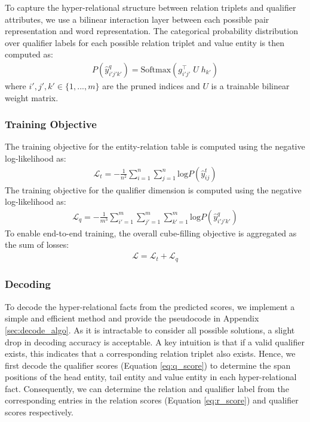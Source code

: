 \documentclass[11pt]{article}
\begin{document}
To capture the hyper-relational structure between relation triplets and qualifier attributes, we use a bilinear interaction layer between each possible pair representation and word representation.
The categorical probability distribution over qualifier labels for each possible relation triplet and value entity is then computed as:
\begin{align} \label{eq:q_score}
    P(\hat{y}^q_{i'j'k'}) = \text{Softmax}(g_{i'j'}^\intercal \; U \; h_{k'})
\end{align}
where $i',j',k' \in \{1,...,m\}$ are the pruned indices and $U$ is a trainable bilinear weight matrix.

\subsubsection{Training Objective}
The training objective for the entity-relation table is computed using the negative log-likelihood as:
\begin{align}
    \mathcal{L}_{t} = - \frac{1}{n^2} \sum_{i=1}^{n} \sum_{j=1}^{n} \text{log} P(
\hat{y}_{ij}^t)
\end{align}
The training objective for the qualifier dimension is computed using the negative log-likelihood as:
\begin{align}
    \mathcal{L}_{q} = - \frac{1}{m^3} \sum_{i'=1}^{m} \sum_{j'=1}^{m} \sum_{k'=1}^{m} \text{log} P(
\hat{y}_{i'j'k'}^q)
\end{align}
To enable end-to-end training, the overall cube-filling objective is aggregated as the sum of losses:
\begin{align}
    \mathcal{L} = \mathcal{L}_{t} + \mathcal{L}_{q}
\end{align}

\subsubsection{Decoding}
To decode the hyper-relational facts from the predicted scores, we implement a simple and efficient method and provide the pseudocode in Appendix \ref{sec:decode_algo}.
As it is intractable to consider all possible solutions, a slight drop in decoding accuracy is acceptable.
A key intuition is that if a valid qualifier exists, this indicates that a corresponding relation triplet also exists.
Hence, we first decode the qualifier scores 
(Equation \ref{eq:q_score})
to determine the span positions of the head entity, tail entity and value entity in each hyper-relational fact.
Consequently, we can determine the relation and qualifier label from the corresponding entries in the relation scores (Equation \ref{eq:r_score}) and qualifier scores respectively.
\end{document}
